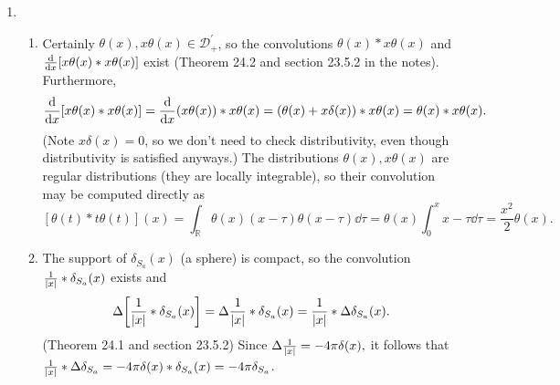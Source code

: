 \documentclass[11pt]{article}
\begin{document}
\begin{enumerate}
    \hrulefill

    \item\begin{enumerate}[label=(\roman*)]
        \item Certainly $\theta(x), x\theta(x)\in \mathcal D_+^\prime$, so the convolutions $\theta(x)\ast x\theta(x)$ and $\dv x[x\theta(x)\ast x\theta(x)]$ exist (Theorem 24.2 and section 23.5.2 in the notes). Furthermore, 
        \[\dv x[x\theta(x)\ast x\theta(x)] = \dv x(x\theta(x))\ast x\theta(x) = (\theta(x) + x\delta(x))\ast x\theta(x) = \theta(x)\ast x\theta (x).\] (Note $x\delta(x) = 0$, so we don't need to check distributivity, even though distributivity is satisfied anyways.) The distributions $\theta(x),x\theta(x)$ are regular distributions (they are locally integrable), so their convolution may be computed directly as \[[\theta(t)\ast t\theta(t)](x) = \int_{\mathbb R}\theta(x)(x-\tau)\theta(x-\tau)\dd \tau = \theta(x)\int_0^x x-\tau \dd \tau = \frac{x^2}{2}\theta(x).\]
        \item The support of $\delta_{S_a}(x)$ (a sphere) is compact, so the convolution $\frac{1}{\abs{x}}\ast\delta_{S_a}(x)$ exists and 
        \[\Delta\bigg[\frac{1}{\abs{x}}\ast\delta_{S_a}(x)\bigg] = \Delta\frac{1}{\abs{x}}\ast\delta_{S_a}(x) = \frac{1}{\abs{x}}\ast \Delta \delta_{S_a}(x).\] (Theorem 24.1 and section 23.5.2) Since $\Delta \frac{1}{\abs{x}} = -4\pi\delta(x),$ it follows that $\frac{1}{\abs{x}}\ast \Delta \delta_{S_a} = -4\pi\delta(x)\ast \delta_{S_a}(x) = -4\pi \delta_{S_a}$.
    \end{enumerate}


\end{enumerate}
\end{document}
